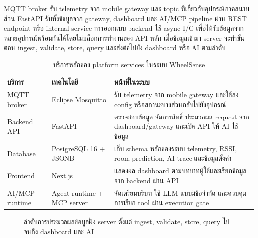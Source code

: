 MQTT broker รับ telemetry จาก mobile gateway และ topic ที่เกี่ยวกับอุปกรณ์ภาคสนาม ส่วน FastAPI รับทั้งข้อมูลจาก gateway, dashboard และ AI/MCP pipeline ผ่าน REST endpoint หรือ internal service การออกแบบ backend ใช้ async I/O เพื่อให้รับข้อมูลจากหลายอุปกรณ์พร้อมกันได้โดยไม่บล็อกการทำงานของ API หลัก เมื่อข้อมูลเข้ามา server จะทำขั้นตอน ingest, validate, store, query และส่งต่อไปยัง dashboard หรือ AI ตามลำดับ

\begin{table}[H]
    \centering
    \caption{บริการหลักของ platform services ในระบบ WheelSense}
    \label{tab:ch3_services}
    \small
    \renewcommand{\arraystretch}{1.2}
    \begin{tabular}{|L{3.0cm}|L{3.2cm}|L{6.2cm}|}
        \hline
        \textbf{บริการ} & \textbf{เทคโนโลยี} & \textbf{หน้าที่ในระบบ} \\ \hline
        MQTT broker & Eclipse Mosquitto & รับ telemetry จาก mobile gateway และใช้ส่ง config หรือสถานะบางส่วนกลับไปยังอุปกรณ์ \\ \hline
        Backend API & FastAPI & ตรวจสอบข้อมูล จัดการสิทธิ์ ประมวลผล request จาก dashboard/gateway และเปิด API ให้ AI ใช้ข้อมูล \\ \hline
        Database & PostgreSQL 16 + JSONB & เก็บ schema หลักของระบบ telemetry, RSSI, room prediction, AI trace และข้อมูลตั้งค่า \\ \hline
        Frontend & Next.js & แสดงผล dashboard ตามบทบาทผู้ใช้และเรียกข้อมูลจาก backend ผ่าน API \\ \hline
        AI/MCP runtime & Agent runtime + MCP server & จัดเตรียมบริบท ใช้ LLM แบบมีข้อจำกัด และควบคุมการเรียก tool ผ่าน execution gate \\ \hline
    \end{tabular}
\end{table}

\begin{figure}[!htbp]
    \centering
    \caption{ลำดับการประมวลผลข้อมูลฝั่ง server ตั้งแต่ ingest, validate, store, query ไปจนถึง dashboard และ AI}
    \label{fig:ch3-server-ingestion}
\end{figure}
\FloatBarrier

